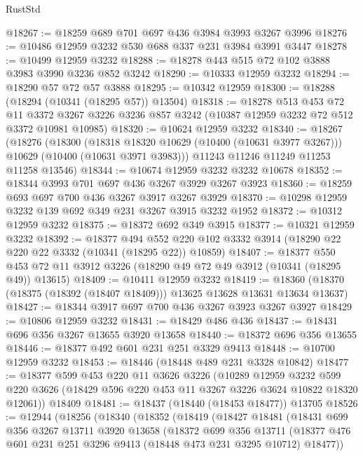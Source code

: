 \begin{lexlean}{RustStd}
\begin{coremodule}
@18267 := @18259 @689 @701 @697 @436 @3984 @3993 @3267 @3996
@18276 := @10486 @12959 @3232 @530 @688 @337 @231 @3984 @3991 @3447
@18278 := @10499 @12959 @3232
@18288 := @18278 @443 @515 @72 @102 @3888 @3983 @3990 @3236 @852 @3242
@18290 := @10333 @12959 @3232
@18294 := @18290 @57 @72 @57 @3888
@18295 := @10342 @12959
@18300 := @18288 (@18294 (@10341 (@18295 @57)) @13504)
@18318 := @18278
    @513
    @453
    @72
    @11
    @3372
    @3267
    @3226
    @3236
    @857
    @3242
    (@10387 @12959 @3232 @72 @512 @3372 @10981 @10985)
@18320 := @10624 @12959 @3232
@18340 := @18267
    (@18276
      (@18300
        (@18318 @18320 @10629 (@10400 (@10631 @3977 @3267)))
        @10629
        (@10400 (@10631 @3971 @3983)))
      @11243
      @11246
      @11249
      @11253
      @11258
      @13546)
@18344 := @10674 @12959 @3232 @3232 @10678
@18352 := @18344 @3993 @701 @697 @436 @3267 @3929 @3267 @3923
@18360 := @18259 @693 @697 @700 @436 @3267 @3917 @3267 @3929
@18370 := @10298 @12959 @3232 @139 @692 @349 @231 @3267 @3915 @3232 @1952
@18372 := @10312 @12959 @3232
@18375 := @18372 @692 @349 @3915
@18377 := @10321 @12959 @3232
@18392 := @18377
    @494
    @552
    @220
    @102
    @3332
    @3914
    (@18290 @22 @220 @22 @3332 (@10341 (@18295 @22)) @10859)
@18407 := @18377
    @550
    @453
    @72
    @11
    @3912
    @3226
    (@18290 @49 @72 @49 @3912 (@10341 (@18295 @49)) @13615)
@18409 := @10411 @12959 @3232
@18419 := @18360 (@18370 (@18375 (@18392 (@18407 @18409))) @13625 @13628 @13631 @13634 @13637)
@18427 := @18344 @3917 @697 @700 @436 @3267 @3923 @3267 @3927
@18429 := @10806 @12959 @3232
@18431 := @18429 @486 @436
@18437 := @18431 @696 @356 @3267 @13655 @3920 @13658
@18440 := @18372 @696 @356 @13655
@18446 := @18377 @492 @601 @231 @251 @3329 @9413
@18448 := @10700 @12959 @3232
@18453 := @18446 (@18448 @489 @231 @3328 @10842)
@18477 := @18377
    @599
    @453
    @220
    @11
    @3626
    @3226
    (@10289
      @12959
      @3232
      @599
      @220
      @3626
      (@18429 @596 @220 @453 @11 @3267 @3226 @3624 @10822 @18320 @12061))
    @18409
@18481 := @18437 (@18440 (@18453 @18477)) @13705
@18526 := @12944
    (@18256
      (@18340
        (@18352
          (@18419
            (@18427
              @18481
              (@18431
                @699
                @356
                @3267
                @13711
                @3920
                @13658
                (@18372
                  @699
                  @356
                  @13711
                  (@18377 @476 @601 @231 @251 @3296 @9413 (@18448 @473 @231 @3295 @10712) @18477))

\end{coremodule}
\end{lexlean}
